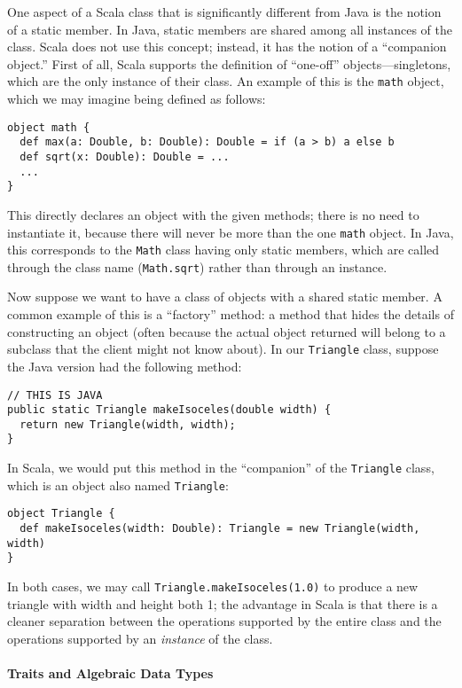 One aspect of a Scala class that is significantly different from Java is the notion of a static member. In Java, static members are shared among all instances of the class. Scala does not use this concept; instead, it has the notion of a ``companion object.'' First of all, Scala supports the definition of ``one-off'' objects---singletons, which are the only instance of their class. An example of this is the \texttt{math} object, which we may imagine being defined as follows:
\begin{verbatim}
object math {
  def max(a: Double, b: Double): Double = if (a > b) a else b
  def sqrt(x: Double): Double = ...
  ...
}
\end{verbatim}
This directly declares an object with the given methods; there is no need to instantiate it, because there will never be more than the one \texttt{math} object. In Java, this corresponds to the \texttt{Math} class having only static members, which are called through the class name (\texttt{Math.sqrt}) rather than through an instance.

Now suppose we want to have a class of objects with a shared static member. A common example of this is a ``factory'' method: a method that hides the details of constructing an object (often because the actual object returned will belong to a subclass that the client might not know about). In our \texttt{Triangle} class, suppose the Java version had the following method:
\begin{verbatim}
// THIS IS JAVA
public static Triangle makeIsoceles(double width) {
  return new Triangle(width, width);
}
\end{verbatim}
In Scala, we would put this method in the ``companion'' of the \texttt{Triangle} class, which is an object also named \texttt{Triangle}:
\begin{verbatim}
object Triangle {
  def makeIsoceles(width: Double): Triangle = new Triangle(width, width)
}
\end{verbatim}
In both cases, we may call \texttt{Triangle.makeIsoceles(1.0)} to produce a new triangle with width and height both 1; the advantage in Scala is that there is a cleaner separation between the operations supported by the entire class and the operations supported by an \emph{instance} of the class.

\paragraph{Traits and Algebraic Data Types}

